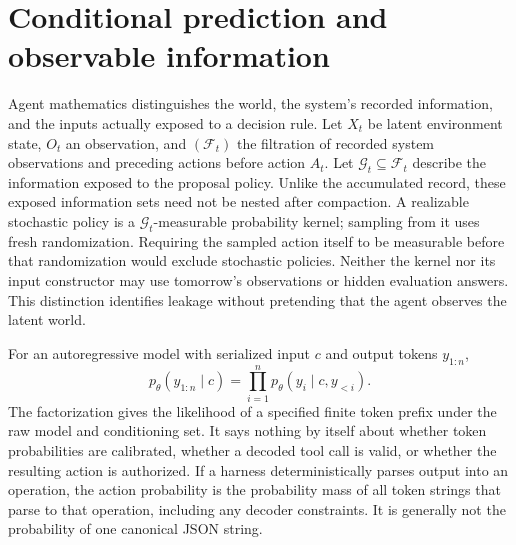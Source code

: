 \section{Conditional prediction and observable information}\label{sec:C02:01}
Agent mathematics distinguishes the world, the system's recorded information, and the inputs actually exposed to a decision rule. Let $X_t$ be latent environment state, $O_t$ an observation, and $(\mathcal F_t)$ the filtration of recorded system observations and preceding actions before action $A_t$. Let $\mathcal G_t\subseteq\mathcal F_t$ describe the information exposed to the proposal policy. Unlike the accumulated record, these exposed information sets need not be nested after compaction. A realizable stochastic policy is a $\mathcal G_t$-measurable probability kernel; sampling from it uses fresh randomization. Requiring the sampled action itself to be measurable before that randomization would exclude stochastic policies. Neither the kernel nor its input constructor may use tomorrow's observations or hidden evaluation answers. This distinction identifies leakage without pretending that the agent observes the latent world.

For an autoregressive model with serialized input $c$ and output tokens $y_{1:n}$,
\begin{equation}
 p_\theta(y_{1:n}\mid c)=\prod_{i=1}^{n}
 p_\theta(y_i\mid c,y_{<i}).
\end{equation}
The factorization gives the likelihood of a specified finite token prefix under the raw model and conditioning set. It says nothing by itself about whether token probabilities are calibrated, whether a decoded tool call is valid, or whether the resulting action is authorized. If a harness deterministically parses output into an operation, the action probability is the probability mass of all token strings that parse to that operation, including any decoder constraints. It is generally not the probability of one canonical JSON string.


